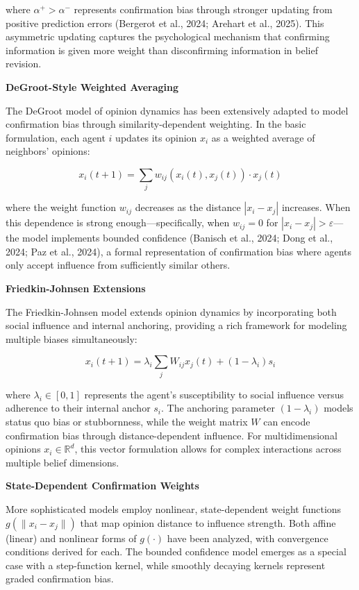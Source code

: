 where \(\alpha^+ > \alpha^-\) represents confirmation bias through
stronger updating from positive prediction errors (Bergerot et al.,
2024; Arehart et al., 2025). This asymmetric updating captures the
psychological mechanism that confirming information is given more weight
than disconfirming information in belief revision.

\textbf{DeGroot-Style Weighted Averaging}

The DeGroot model of opinion dynamics has been extensively adapted to
model confirmation bias through similarity-dependent weighting. In the
basic formulation, each agent \(i\) updates its opinion \(x_i\) as a
weighted average of neighbors' opinions:

\[x_i(t+1) = \sum_{j} w_{ij}(x_i(t), x_j(t)) \cdot x_j(t)\]

where the weight function \(w_{ij}\) decreases as the distance
\(|x_i - x_j|\) increases. When this dependence is strong
enough---specifically, when \(w_{ij} = 0\) for
\(|x_i - x_j| > \varepsilon\)---the model implements bounded confidence
(Banisch et al., 2024; Dong et al., 2024; Paz et al., 2024), a formal
representation of confirmation bias where agents only accept influence
from sufficiently similar others.

\textbf{Friedkin-Johnsen Extensions}

The Friedkin-Johnsen model extends opinion dynamics by incorporating
both social influence and internal anchoring, providing a rich framework
for modeling multiple biases simultaneously:

\[x_i(t+1) = \lambda_i \sum_{j} W_{ij} x_j(t) + (1 - \lambda_i) s_i\]

where \(\lambda_i \in [0,1]\) represents the agent's susceptibility to
social influence versus adherence to their internal anchor \(s_i\). The
anchoring parameter \((1 - \lambda_i)\) models status quo bias or
stubbornness, while the weight matrix \(W\) can encode confirmation bias
through distance-dependent influence. For multidimensional opinions
\(x_i \in \mathbb{R}^d\), this vector formulation allows for complex
interactions across multiple belief dimensions.

\textbf{State-Dependent Confirmation Weights}

More sophisticated models employ nonlinear, state-dependent weight
functions \(g(\|x_i - x_j\|)\) that map opinion distance to influence
strength. Both affine (linear) and nonlinear forms of \(g(\cdot)\) have
been analyzed, with convergence conditions derived for each. The bounded
confidence model emerges as a special case with a step-function kernel,
while smoothly decaying kernels represent graded confirmation bias.


